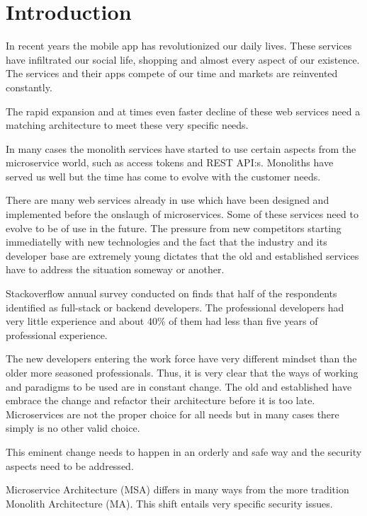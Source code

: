


\section{Introduction}

In recent years the mobile app has revolutionized our daily lives. 
These services have infiltrated our social life, shopping and almost 
every aspect of our existence. The services and their apps compete of 
our time and markets are reinvented constantly.

The rapid expansion and at times even faster decline of these web services 
need a matching architecture to meet these very specific needs. 

In many cases the monolith services have started to use certain aspects 
from the microservice world, such as access tokens and REST API:s. 
Monoliths have served us well but the time has come to evolve with the customer needs.

There are many web services already in use which have been designed and 
implemented before the onslaugh of microservices. Some of these services 
need to evolve to be of use in the future. The pressure from new competitors 
starting immediatelly with new technologies and the fact that the industry and its 
developer base are extremely young dictates that the old and established services
have to address the situation someway or another.

Stackoverflow annual survey \citep{stackoverflowsurvey2019} conducted on finds that half of 
the respondents identified as full-stack or backend developers. 
The professional developers had very little experience 
and about 40\% of them had less than five years of professional experience. 

The new developers entering the work force have very different mindset than the older 
more seasoned professionals. Thus, it is very clear that the ways of working and 
paradigms to be used are in constant change. The old and established have embrace 
the change and refactor their architecture before it is too late. Microservices are 
not the proper choice for all needs \citep{newman2019} but in many cases there simply is no other valid choice.

This eminent change needs to happen in an orderly and safe way and the security aspects need to be addressed. 

Microservice Architecture (MSA) differs in many ways from 
the more tradition Monolith Architecture (MA). This shift entails very specific security issues.

